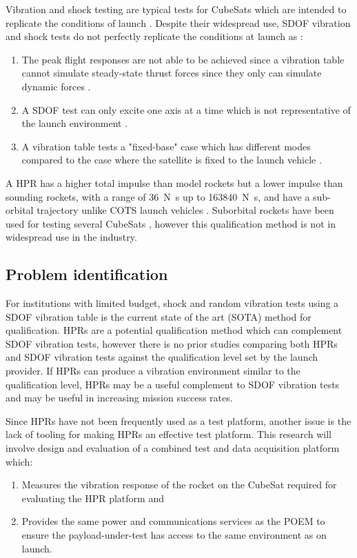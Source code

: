 \documentclass[a4paper,11pt]{article}
\begin{document}
Vibration and shock testing are typical tests for CubeSats which are intended to replicate the conditions of launch \cite{welle2020overview}. Despite their widespread use, SDOF vibration and shock tests do not perfectly replicate the conditions at launch as \cite{gordon2015benefits,nath2022study}:
\begin{enumerate}
  \item The peak flight responses are not able to be achieved since a vibration table cannot simulate steady-state thrust forces since they only can simulate dynamic forces \cite{gordon2015benefits}.
  \item A SDOF test can only excite one axis at a time which is not representative of the launch environment \cite{gordon2015benefits,nath2022study}.
  \item A vibration table tests a "fixed-base" case which has different modes compared to the case where the satellite is fixed to the launch vehicle \cite{gordon2015benefits}.
\end{enumerate}

A HPR has a higher total impulse than model rockets but a lower impulse than sounding rockets, with a range of \SI{36}{\newton\second} up to \SI{163840}{\newton\second}, and have a sub-orbital trajectory unlike COTS launch vehicles \cite{pierce2019development}. Suborbital rockets have been used for testing several CubeSats \cite{9316404,minelli2019mobile}, however this qualification method is not in widespread use in the industry.

\subsection{Problem identification}
For institutions with limited budget, shock and random vibration tests using a SDOF vibration table is the current state of the art (SOTA) method for qualification. HPRs are a potential qualification method which can complement SDOF vibration tests, however there is no prior studies comparing both HPRs and SDOF vibration tests against the qualification level set by the launch provider. If HPRs can produce a vibration environment similar to the qualification level, HPRs may be a useful complement to SDOF vibration tests and may be useful in increasing mission success rates.

Since HPRs have not been frequently used as a test platform, another issue is the lack of tooling for making HPRs an effective test platform. This research will involve design and evaluation of a combined test and data acquisition platform which:
\begin{enumerate}
  \item Measures the vibration response of the rocket on the CubeSat required for evaluating the HPR platform and
  \item Provides the same power and communications services as the POEM to ensure the payload-under-test has access to the same environment as on launch.
\end{enumerate}
\end{document}
